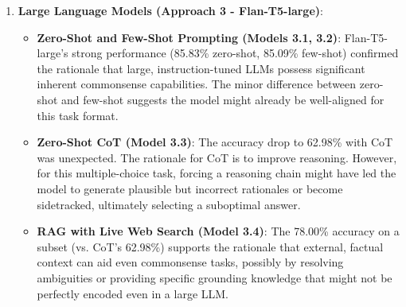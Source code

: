 \documentclass[10.5pt]{article}
\begin{document}
\begin{enumerate}
    \item \textbf{Large Language Models (Approach 3 - Flan-T5-large)}:
        \begin{itemize}
            \item \textbf{Zero-Shot and Few-Shot Prompting (Models 3.1, 3.2)}: Flan-T5-large's strong performance (85.83\% zero-shot, 85.09\% few-shot) confirmed the rationale that large, instruction-tuned LLMs possess significant inherent commonsense capabilities. The minor difference between zero-shot and few-shot suggests the model might already be well-aligned for this task format.
            \item \textbf{Zero-Shot CoT (Model 3.3)}: The accuracy drop to 62.98\% with CoT was unexpected. The rationale for CoT is to improve reasoning. However, for this multiple-choice task, forcing a reasoning chain might have led the model to generate plausible but incorrect rationales or become sidetracked, ultimately selecting a suboptimal answer.
            \item \textbf{RAG with Live Web Search (Model 3.4)}: The 78.00\% accuracy on a subset (vs. CoT's 62.98\%) supports the rationale that external, factual context can aid even commonsense tasks, possibly by resolving ambiguities or providing specific grounding knowledge that might not be perfectly encoded even in a large LLM.
        \end{itemize}
\end{enumerate}
\end{document}
